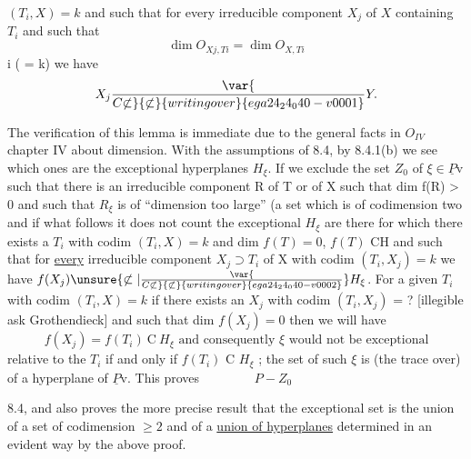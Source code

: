 
$(T_i, X) = k$ and such that for every irreducible component $X_j$ of $X$
containing $T_i$ and such that
\[ \dim O_{Xj, Ti} = \dim O_{X, Ti} \]
i ( = k) we have
\[ X_j \var{\over{C}{\not\subset}}{\not\subset}{writing over}{ega24_24_040-v0001} Y. \]

The verification of this lemma is immediate due to the general
facts in $O_{IV}$ chapter IV about dimension.  With the assumptions of
8.4, by 8.4.1(b) we see which ones are the exceptional hyperplanes
$H_\xi$.  If we exclude the set $Z_0$ of $\xi \in \underline{P}\mathrm{v}$ such that there is an
irreducible component R of T or of X such that dim f(R) > 0 and
such that $R_\xi$ is of ``dimension too large'' (a set which is of
codimension two and if what follows it does not count the
exceptional $H_\xi$ are there for which there exists a $T_i$ with codim
$(T_i, X) = k$ and dim $f(T) = 0$, $f(T)$ CH and such that for \uline{every}
irreducible component $X_j \supset T_i$ of X with codim $(T_i, X_j) = k$ we have
$f(X_j) \unsure{\not\subset|\var{\over{C}{\not\subset}}{\not\subset}{writing over}{ega24_24_040-v0002}} H_\xi$.  For a given $T_i$ with codim $(T_i, X) = k$ if there exists
an $X_j$ with codim $(T_i, X_j)$ = ? [illegible ask Grothendieck]
and such that dim $f(X_j) = 0$ then we will have
\[ f(X_j) = f(T_i)\ \mathrm{C}\ H_\xi \text{ and consequently } \xi \text{ would not be exceptional} \]
relative to the $T_i$ if and only if $f(T_i)$ C $H_\xi$ ; the set of such $\xi$ is
(the trace over) of a hyperplane of $\underline{P}\mathrm{v}$.  This proves
$\qquad\qquad P - Z_0$

8.4, and also proves the more precise result that the exceptional
set is the union of a set of codimension $\geq 2$ and of a \uline{union of
hyperplanes} determined in an evident way by the above proof.
